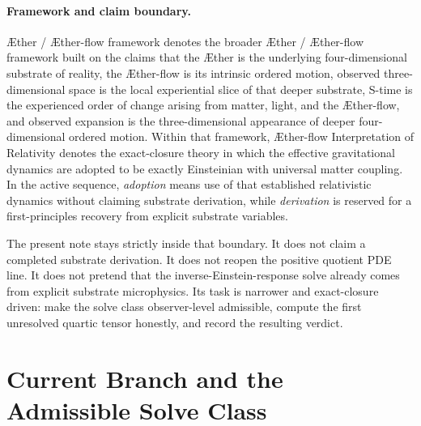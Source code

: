 \documentclass[11pt]{article}
\newcommand{\Aether}{\AE{}ther}
\newcommand{\Aflow}{\AE{}ther-flow}
\newcommand{\TheoryName}{\Aflow{} Interpretation of Relativity}
\newcommand{\TheoryProgram}{\Aether{} / \Aflow{} framework}
\begin{document}
\paragraph{Framework and claim boundary.}
\TheoryProgram{} denotes the broader \Aether{} / \Aflow{} framework built on the claims that the \Aether{} is the underlying four-dimensional substrate of reality, the \Aflow{} is its intrinsic ordered motion, observed three-dimensional space is the local experiential slice of that deeper substrate, S-time is the experienced order of change arising from matter, light, and the \Aflow{}, and observed expansion is the three-dimensional appearance of deeper four-dimensional ordered motion. Within that framework, \TheoryName{} denotes the exact-closure theory in which the effective gravitational dynamics are adopted to be exactly Einsteinian with universal matter coupling. In the active sequence, \emph{adoption} means use of that established relativistic dynamics without claiming substrate derivation, while \emph{derivation} is reserved for a first-principles recovery from explicit substrate variables.

The present note stays strictly inside that boundary. It does not claim a completed substrate derivation. It does not reopen the positive quotient PDE line. It does not pretend that the inverse-Einstein-response solve already comes from explicit substrate microphysics. Its task is narrower and exact-closure driven: make the solve class observer-level admissible, compute the first unresolved quartic tensor honestly, and record the resulting verdict.

\section{Current Branch and the Admissible Solve Class}
\end{document}
